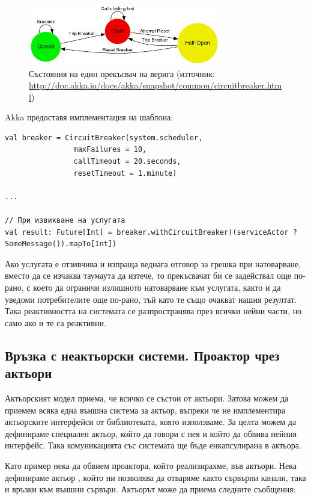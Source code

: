 \begin{figure}
  \centering\includegraphics[width=0.75\textwidth]{images/circuit-breaker-states.png}
  \caption[Състояния на един прекъсвач на верига]{Състояния на един прекъсвач на верига (източник: \url{http://doc.akka.io/docs/akka/snapshot/common/circuitbreaker.html})}
  \label{fig:circuit-breaker-states}
\end{figure}

Akka предоставя имплементация на шаблона:

\begin{lstlisting}[texcl=true]
val breaker = CircuitBreaker(system.scheduler, 
                maxFailures = 10, 
                callTimeout = 20.seconds, 
                resetTimeout = 1.minute)

...

// При извикване на услугата
val result: Future[Int] = breaker.withCircuitBreaker((serviceActor ? SomeMessage()).mapTo[Int])
\end{lstlisting}

Ако услугата е отзивчива и изпраща веднага отговор за грешка при натоварване, вместо да се изчаква таумаута да изтече, то прекъсвачат би се задействал още по-рано, с което да ограничи излишното натоварване към услугата, както и да уведоми потребителите още по-рано, тъй като те също очакват нашия резултат. Така реактивността на системата се разпространява през всички нейни части, но само ако и те са реактивни.

\subsection{Връзка с неактьорски системи. Проактор чрез актьори}

Актьорският модел приема, че всичко се състои от актьори. Затова можем да приемем всяка една външна система за актьор, въпреки че не имплементира актьорските интерфейси от библиотеката, която използваме. За целта можем да дефинираме специален актьор, който да говори с нея и който да обвива нейния интерфейс. Така комуникацията със системата ще бъде енкапсулирана в актьора.

Като пример нека да обвием проактора, който реализирахме, във актьори. Нека дефинираме актьор , който ни позволява да отваряме както сървърни канали, така и връзки към външни сървъри. Актьорът може да приема следните съобщения:

